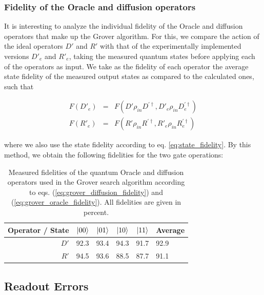 \subsubsection{Fidelity of the Oracle and diffusion operators}

It is interesting to analyze the individual fidelity of the Oracle and diffusion operators that make up the Grover algorithm. For this, we compare the action of the ideal operators $D'$ and $R'$ with that of the experimentally implemented versions $D'_{e}$ and $R'_{e}$, taking the measured quantum states before applying each of the operators as input. We take as the fidelity of each operator the average state fidelity of the measured output states as compared to the calculated ones, such that

\begin{eqnarray}
F(D'_{e}) & = & F(D'\rho_{in}D^{'\dagger},D'_e \rho_{in} D_{e}^{'\dagger}) \label{eq:grover_diffusion_fidelity} \\
F(R'_{e}) & = & F(R'\rho_{in}R^{'\dagger},R'_e \rho_{in} R_{e}^{'\dagger}) \label{eq:grover_oracle_fidelity}
\end{eqnarray}

where we also use the state fidelity according to eq. \ref{eq:state_fidelity}. By this method, we obtain the following fidelities for the two gate operations:

\begin{table}[ht!]
\centering
\begin{tabular}{r|rrrr|l}
Operator / State & $\left| 00 \right>$ & $\left| 01 \right>$ & $\left| 10 \right>$ & $\left| 11 \right>$ & Average \\ \hline 
$D'$ & 92.3 & 93.4 & 94.3 & 91.7 & 92.9 \\
$R'$ & 94.5 & 93.6 & 88.5 & 87.7 & 91.1
\end{tabular}
\caption[Measured fidelities of the quantum Oracle and diffusion operators used in the Grover search algorithm]{Measured fidelities of the quantum Oracle and diffusion operators used in the Grover search algorithm according to eqs. (\ref{eq:grover_diffusion_fidelity}) and (\ref{eq:grover_oracle_fidelity}). All fidelities are given in percent.}
\end{table}

\subsection{Readout Errors}


